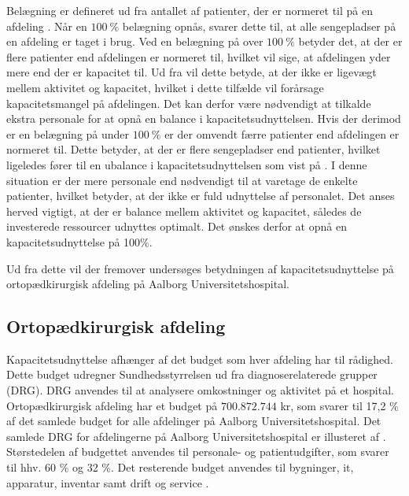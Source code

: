 Belægning er defineret ud fra antallet af patienter, der er normeret til på en afdeling \cite{Heidmann2014}. Når en $100~\%$ belægning opnås, svarer dette til, at alle sengepladser på en afdeling er taget i brug. Ved en belægning på over $100~\%$ betyder det, at der er flere patienter end afdelingen er normeret til, hvilket vil sige, at afdelingen yder mere end der er kapacitet til. Ud fra  vil dette betyde, at der ikke er ligevægt mellem aktivitet og kapacitet, hvilket i dette tilfælde vil forårsage kapacitetsmangel på afdelingen. Det kan derfor være nødvendigt at tilkalde ekstra personale for at opnå en balance i kapacitetsudnyttelsen.\cite{Pauly1986}
Hvis der derimod er en belægning på under $100~\%$ er der omvendt færre patienter end afdelingen er normeret til. Dette betyder, at der er flere sengepladser end patienter, hvilket ligeledes fører til en ubalance i kapacitetsudnyttelsen som vist på . I denne situation er der mere personale end nødvendigt til at varetage de enkelte patienter, hvilket betyder, at der ikke er fuld udnyttelse af personalet.\cite{Pauly1986} 
Det anses herved vigtigt, at der er balance mellem aktivitet og kapacitet, således de investerede ressourcer udnyttes optimalt. Det ønskes derfor at opnå en kapacitetsudnyttelse på 100\%. 

Ud fra dette vil der fremover undersøges betydningen af kapacitetsudnyttelse på ortopædkirurgisk afdeling på Aalborg Universitetshospital. 

\subsection{Ortopædkirurgisk afdeling}
Kapacitetsudnyttelse afhænger af det budget som hver afdeling har til rådighed. Dette budget udregner Sundhedsstyrrelsen ud fra diagnoserelaterede grupper (DRG). DRG anvendes til at analysere omkostninger og aktivitet på et hospital.\cite{DRG2016} Ortopædkirurgisk afdeling har et budget på $700.872.744$ kr, som svarer til 17,2 \% af det samlede budget for alle afdelinger på Aalborg Universitetshospital. Det samlede DRG for afdelingerne på Aalborg Universitetshospital er illusteret af .\cite{Rasmussen2016}
Størstedelen af budgettet anvendes til personale- og patientudgifter, som svarer til hhv. 60 \% og 32 \%. Det resterende budget anvendes til bygninger, it, apparatur, inventar samt drift og service \cite{Noegletal2016}. 


